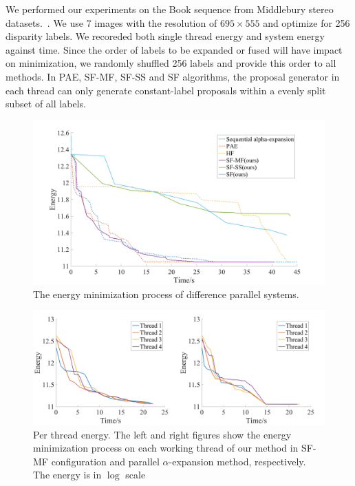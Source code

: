 
We performed our experiments on the Book sequence from Middlebury
stereo datasets.~\cite{middlebury_stereo}. We use 7 images with the
resolution of $695\times555$ and optimize for 256 disparity labels. We
recoreded both single thread energy and system energy against
time. Since the order of labels to be expanded or fused will have
impact on minimization, we randomly shuffled 256 labels and provide
this order to all methods. In PAE, SF-MF, SF-SS and SF algorithms, the
proposal generator in each thread can only generate constant-label
proposals within a evenly split subset of all labels.

\begin{figure}[tb]
  \includegraphics[width=\columnwidth]{figure/stereo_global.png}
  \caption{The energy minimization process of difference parallel systems.}
  \label{fig:stereo_global}
\end{figure}

\begin{figure}[tb]
  \includegraphics[width=\columnwidth]{figure/stereo_threads.png}
  \caption{Per thread energy. The left and right figures show the
    energy minimization process on each working thread of our method
    in SF-MF configuration and parallel $\alpha$-expansion method,
    respectively. The energy is in $\log$ scale}
  \label{fig:stereo_threads}
\end{figure}


